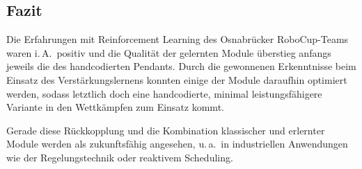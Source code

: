 \subsection{Fazit}
Die Erfahrungen mit Reinforcement Learning des Osnabrücker RoboCup-Teams waren 
i.\,A.\ positiv und die Qualität der gelernten Module überstieg anfangs jeweils 
die des handcodierten Pendants. Durch die gewonnenen Erkenntnisse beim Einsatz 
des Verstärkungslernens konnten einige der Module daraufhin optimiert werden, 
sodass letztlich doch eine handcodierte, minimal leistungsfähigere Variante in 
den Wettkämpfen zum Einsatz kommt.

Gerade diese Rückkopplung und die Kombination klassischer und erlernter Module 
werden als zukunftsfähig angesehen, u.\,a.\ in industriellen Anwendungen wie 
der Regelungstechnik oder reaktivem Scheduling.